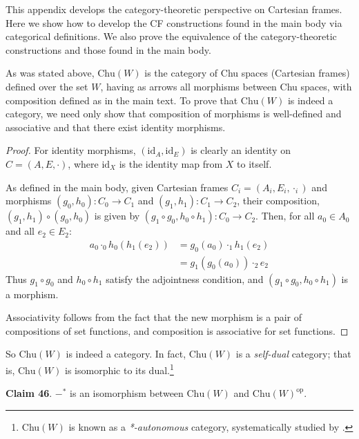 \documentclass{article}
\begin{document}
This appendix develops the category-theoretic perspective on Cartesian frames.
Here we show how to develop the CF constructions found in the main body via categorical definitions.
We also prove the equivalence of the category-theoretic constructions and those found in the main body.

As was stated above, $\text{Chu}(W)$ is the category of Chu spaces (Cartesian frames) defined over the set $W$, having as arrows all morphisms between Chu spaces, with composition defined as in the main text.
To prove that $\text{Chu}(W)$ is indeed a category, we need only show that composition of morphisms is well-defined and associative and that there exist identity morphisms.

\begin{proof}
For identity morphisms, $(\text{id}_A, \text{id}_E)$ is clearly an identity on $C = (A, E, \cdot)$, where $\text{id}_X$ is the identity map from $X$ to itself.

As defined in the main body, given Cartesian frames $C_i = (A_i, E_i, \cdot_i)$ and morphisms $(g_0, h_0) : C_0 \to C_1$ and $(g_1, h_1) : C_1 \to C_2$, their composition, $(g_1, h_1) \circ (g_0, h_0)$ is given by $(g_1 \circ g_0, h_0 \circ h_1) : C_0 \to C_2$.
Then, for all $a_0 \in A_0$ and all $e_2 \in E_2$:
\begin{displaymath}
\begin{split}
  a_0 \cdot_0 h_0(h_1(e_2)) & = g_0(a_0) \cdot_1 h_1(e_2) \\
                            & = g_1(g_0(a_0)) \cdot_2 e_2
\end{split}
\end{displaymath}
Thus $g_1 \circ g_0$ and $h_0 \circ h_1$ satisfy the adjointness condition, and $(g_1 \circ g_0, h_0 \circ h_1)$ is a morphism.

Associativity follows from the fact that the new morphism is a pair of compositions of set functions, and composition is associative for set functions.
\end{proof}

\noindent So $\text{Chu}(W)$ is indeed a category.
In fact, $\text{Chu}(W)$ is a \emph{self-dual} category; that is, $\text{Chu}(W)$ is isomorphic to its dual.\footnote{Chu$(W)$ is known as a \emph{*-autonomous} category, systematically studied by \cite{barr1979autonomous}.}

\bigskip
\noindent \textbf{Claim 46}.
$-^*$ is an isomorphism between $\text{Chu}(W)$ and $\text{Chu}(W)^{\text{op}}$.
\end{document}
